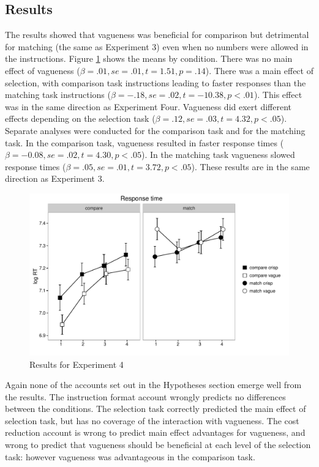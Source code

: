 \documentclass[graybox,envcountchap,sectrefs%
,footinfo
]{svmono}
\begin{document}
\subsection{Results}
The results showed that vagueness was beneficial for comparison but detrimental for matching (the same as Experiment 3) even when no numbers were allowed in the instructions. Figure \ref{resultse4} shows the means by condition. There was no main effect of vagueness ($\beta=.01, se=.01, t=1.51, p=.14$). There was a main effect of selection, with comparison task instructions leading to faster responses than the matching task instructions ($\beta=-.18, se=.02, t=-10.38, p<.01$). This effect was in the same direction as Experiment Four. Vagueness did  exert different effects depending on the selection task ($\beta=.12, se=.03, t=4.32, p<.05$). Separate analyses were conducted for the comparison task and for the matching task. In the comparison task, vagueness resulted in faster response times ($\beta=-0.08, se=.02, t=4.30, p<.05$). In the matching task vagueness slowed response times ($\beta=.05, se=.01, t=3.72, p<.05$). These results are in the same direction as Experiment 3.

\begin{figure}[htbp]
\centering
\includegraphics[width=.75\textwidth]{images/response-time-two-panels-1-e4.pdf}
\caption{Results for Experiment 4}
\label{resultse4}
\end{figure}

Again none of the accounts set out in the Hypotheses section emerge well from the results. The instruction format account wrongly predicts no differences between the conditions. The selection task correctly predicted the main effect of selection task, but has no coverage of the interaction with vagueness. The cost reduction account is wrong to predict main effect advantages for vagueness, and wrong to predict that vagueness should be beneficial at each level of the selection task: however vagueness was advantageous in the comparison task.
\end{document}
